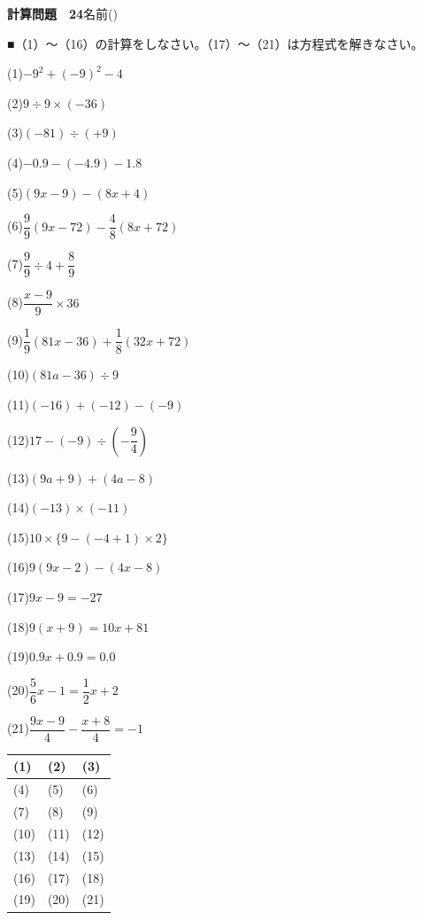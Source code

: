 \documentclass[a4paper,11pt]{ltjsarticle}
\newlength{\qcol}\setlength{\qcol}{0.47\textwidth}
\newlength{\qgap}
\newlength{\anscolw}\setlength{\anscolw}{0.30\textwidth}
\newlength{\ansh}
\newcommand{\Q}[2]{\parbox[t]{\qcol}{\raggedright (#1)\hspace{0.6em}$\displaystyle #2$}}
\newcommand{\QR}[4]{\Q{#1}{#2}\hfill\Q{#3}{#4}\par\vspace{\qgap}}
\newcommand{\anscell}[1]{\rule[-\ansdrop]{0pt}{\ansh}(#1)}
\newlength{\ansdrop}
\begin{document}
{\large\bfseries 計算問題　24}\hfill 名前(\underline{\hspace{32mm}})\par\vspace{3mm}
■（1）〜（16）の計算をしなさい。（17）〜（21）は方程式を解きなさい。\par\vspace{3mm}
\setlength{\qgap}{5.4mm}
\QR{1}{-9^2+(-9)^2-4}{2}{9\div9\times(-36)}
\QR{3}{(-81)\div(+9)}{4}{-0.9-(-4.9)-1.8}
\QR{5}{(9x-9)-(8x+4)}{6}{\dfrac{9}{9}(9x-72)-\dfrac{4}{8}(8x+72)}
\QR{7}{\dfrac{9}{9}\div4+\dfrac{8}{9}}{8}{\dfrac{x-9}{9}\times36}
\QR{9}{\dfrac{1}{9}(81x-36)+\dfrac{1}{8}(32x+72)}{10}{(81a-36)\div9}
\QR{11}{(-16)+(-12)-(-9)}{12}{17-(-9)\div\left(-\dfrac{9}{4}\right)}
\QR{13}{(9a+9)+(4a-8)}{14}{(-13)\times(-11)}
\QR{15}{10\times\{9-(-4+1)\times2\}}{16}{9(9x-2)-(4x-8)}
\QR{17}{9x-9=-27}{18}{9(x+9)=10x+81}
\QR{19}{0.9x+0.9=0.0}{20}{\dfrac{5}{6}x-1=\dfrac{1}{2}x+2}
\vspace{1mm}
\Q{21}{\dfrac{9x-9}{4}-\dfrac{x+8}{4}=-1}\par\vspace{3mm}
\setlength{\ansh}{9.5mm}\setlength{\ansdrop}{6mm}%
\begin{center}\begin{tabular}{|p{\anscolw}|p{\anscolw}|p{\anscolw}|}\hline
\anscell{1} & \anscell{2} & \anscell{3} \\\hline
\anscell{4} & \anscell{5} & \anscell{6} \\\hline
\anscell{7} & \anscell{8} & \anscell{9} \\\hline
\anscell{10} & \anscell{11} & \anscell{12} \\\hline
\anscell{13} & \anscell{14} & \anscell{15} \\\hline
\anscell{16} & \anscell{17} & \anscell{18} \\\hline
\anscell{19} & \anscell{20} & \anscell{21} \\\hline
\end{tabular}\end{center}
\end{document}
